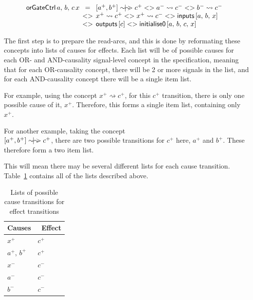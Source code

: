\documentclass[british,conference,compsoc]{IEEEtran}
\begin{document}
\[
\begin{array}{lcl}
\hspace{-2mm}\mathsf{orGateCtrl}\,a,\,b,\,c\,x&\hspace{-2mm}=&\hspace{-2mm}[a^{+}, b^{+}]\sim\hspace{-1.5mm}|\hspace{-1.5mm}\sim\hspace{-1.5mm}>c^{+} 
<> a^{-}\rightsquigarrow c^{-} <> b^{-}\rightsquigarrow c^{-}\\
~&\hspace{-2mm}<>&\hspace{-2mm}x^{+}\rightsquigarrow c^{+} <>
x^{+}\rightsquigarrow c^{-} <> \mathsf{inputs} \, [a,\,b,\,x] \\
~&\hspace{-2mm}<>&\hspace{-2mm}\mathsf{outputs}\,[c]<>\mathsf{initialise0}\,[a,\,b,\,c,\,x]
\end{array}
\]

\noindent The first step is to prepare the read-arcs, and this is done by
reformating these concepts into lists of causes for effects.
Each list will be of possible causes for each OR- and AND-causality signal-level
concept in the specification, meaning that for each OR-causality concept, there will
be 2 or more signals in the list, and for each AND-causality concept there will be a single
item list. 

For example, using the concept $x^{+} \rightsquigarrow c^{+}$, for this $c^{+}$ transition,
there is only one possible cause of it, $x^{+}$. Therefore, this forms a single item list, 
containing only $x^{+}$.

For another example, taking the concept\\$[a^{+}, b^{+}]\sim\hspace{-1.5mm}|\hspace{-1.5mm}\sim\hspace{-1.5mm}>c^{+}$, there are
two possible transitions for $c^{+}$ here, $a^{+}$ and $b^{+}$. These therefore form 
a two item list. 

This will mean there may be several different lists for each cause transition. 
Table~\ref{tab:list-of-concepts} contains all of the lists described above.

\begin{table}[h]
\caption{Lists of possible cause transitions for effect transitions\label{tab:list-of-concepts}}

  \centering
\begin{tabular}[htb]{| m{2.6cm} | m{2.0cm} |}
  \hline
Causes & \, Effect \\ \hline \hline
$x^{+}$ & $c^{+}$ \\ \hline
$a^{+}$, $b^{+}$ & $c^{+}$ \\ \hline
$x^{-}$ & $c^{-}$ \\ \hline
$a^{-}$ & $c^{-}$ \\ \hline
$b^{-}$ & $c^{-}$ \\ \hline
  \end{tabular}
\end{table}
\end{document}
